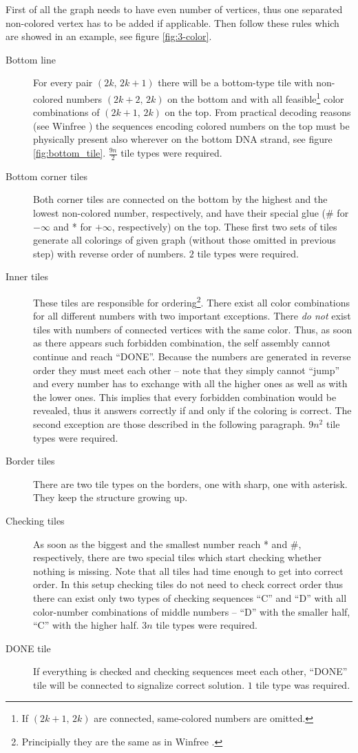 First of all the graph needs to have even number of vertices, thus one separated non-colored vertex has to be added if applicable. Then follow these rules which are showed in an example, see figure \ref{fig:3-color}.
\begin{description}
	\item[Bottom line] For every pair $(2k,\,2k+1)$ there will be a bottom-type tile with non-colored numbers $(2k+2,\,2k)$ on the bottom and with all feasible\footnote{If $(2k+1,\,2k)$ are connected, same-colored numbers are omitted.} color combinations of $(2k+1,\,2k)$ on the top. From practical decoding reasons (see Winfree \cite{winfree_phd}) the sequences encoding colored numbers on the top must be physically present also wherever on the bottom DNA strand, see figure \ref{fig:bottom_tile}. $\frac{9n}{2}$ tile types were required.
	\item[Bottom corner tiles] Both corner tiles are connected on the bottom by the highest and the lowest non-colored number, respectively, and have their special glue (\# for $-\infty$ and * for $+\infty$, respectively) on the top. These first two sets of tiles generate all colorings of given graph (without those omitted in previous step) with reverse order of numbers. $2$ tile types were required.
	\item[Inner tiles] These tiles are responsible for ordering\footnote{Principially they are the same as in Winfree \cite{winfree_phd}.}. There exist all color combinations for all different numbers with two important exceptions. There {\em do not} exist tiles with numbers of connected vertices with the same color. Thus, as soon as there appears such forbidden combination, the self assembly cannot continue and reach ``DONE''. Because the numbers are generated in reverse order they must meet each other -- note that they simply cannot ``jump'' and every number has to exchange with all the higher ones as well as with the lower ones. This implies that every forbidden combination would be revealed, thus it answers correctly if and only if the coloring is correct. The second exception are those described in the following paragraph. $9n^2$ tile types were required.
	\item[Border tiles] There are two tile types on the borders, one with sharp, one with asterisk. They keep the structure growing up.
	\item[Checking tiles] As soon as the biggest and the smallest number reach * and \#, respectively, there are two special tiles which start checking whether nothing is missing. Note that all tiles had time enough to get into correct order. In this setup checking tiles do not need to check correct order thus there can exist only two types of checking sequences ``C'' and ``D'' with all color-number combinations of middle numbers -- ``D'' with the smaller half, ``C'' with the higher half. $3n$ tile types were required.
	\item[DONE tile] If everything is checked and checking sequences meet each other, ``DONE'' tile will be connected to signalize correct solution. $1$ tile type was required.
\end{description}
